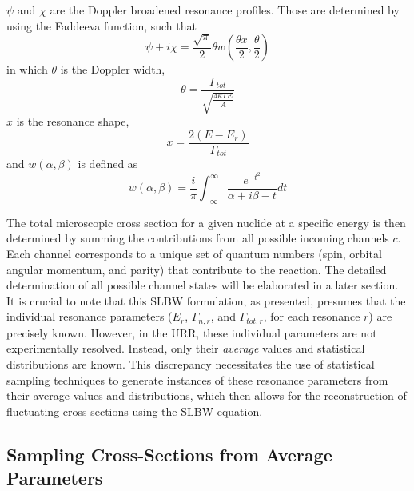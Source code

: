 $\psi$ and $\chi$ are the Doppler broadened resonance profiles. Those are determined by using the Faddeeva function\cite{algo-916}, such that
\begin{equation}
    \label{eq:faddeeva}
    \psi + i\chi = \frac{\sqrt{\pi}}{2}\theta w \left(\frac{\theta x}{2}, \frac{\theta}{2} \right)
\end{equation}
in which $\theta$ is the Doppler width,
\begin{equation}
    \theta = \frac{\Gamma_{tot}}{\sqrt{\frac{4 \kappa T E}{A}}}
    \label{eq:doppler-width}
\end{equation}
$x$ is the resonance shape,
\begin{equation}
    x = \frac{2 (E - E_r)}{\Gamma_{tot}}
\end{equation}
and $w(\alpha,\beta)$ is defined as
\begin{equation}
    w(\alpha,\beta) = \frac{i}{\pi} \int_{-\infty}^{\infty} \frac{e^{-t^2}}{\alpha + i\beta - t}dt
\end{equation}

The total microscopic cross section for a given nuclide at a specific energy is then determined by summing the contributions from all possible incoming channels $c$. Each channel corresponds to a unique set of quantum numbers (spin, orbital angular momentum, and parity) that contribute to the reaction. The detailed determination of all possible channel states will be elaborated in a later section. It is crucial to note that this SLBW formulation, as presented, presumes that the individual resonance parameters ($E_r$, $\Gamma_{n,r}$, and $\Gamma_{tot,r}$, for each resonance $r$) are precisely known. However, in the URR, these individual parameters are not experimentally resolved. Instead, only their \textit{average} values and statistical distributions are known. This discrepancy necessitates the use of statistical sampling techniques to generate instances of these resonance parameters from their average values and distributions, which then allows for the reconstruction of fluctuating cross sections using the SLBW equation.

\subsection{Sampling Cross-Sections from Average Parameters}
\label{sec:sampling-parameters}


